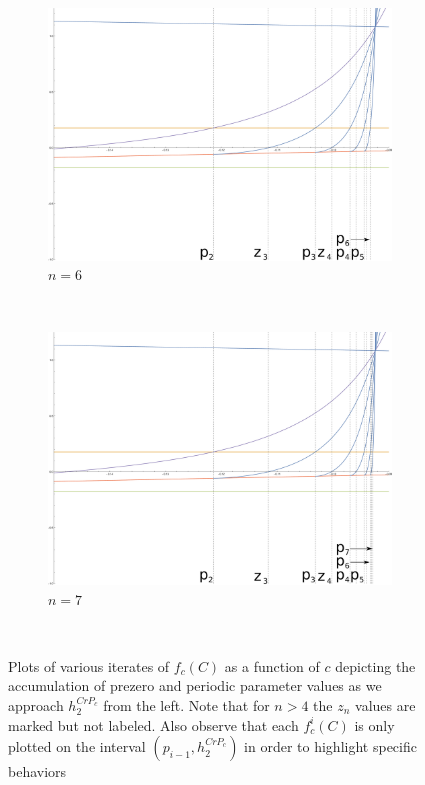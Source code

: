 \begin{figure}[ht]
\begin{subfigure}[b]{0.5\textwidth}
				\includegraphics[width=\textwidth]{./img/cplot5H}
				\caption{$n=6$}
				\label{fig:cplot5H}
		\end{subfigure}%
		~ %
		\begin{subfigure}[b]{0.5\textwidth}
				\includegraphics[width=\textwidth]{./img/cplot6H}
				\caption{$n=7$}
				\label{fig:cplot6H}
		\end{subfigure}
		~ %
		\caption{Plots of various iterates of $f_c (C)$ as a function of $c$ depicting the accumulation of prezero and periodic parameter values as we approach $h_2^{CrP_c}$ from the left. Note that for $n > 4$ the $z_n$ values are marked but not labeled. Also observe that each $f^i_c (C)$ is only plotted on the interval $ (p_{i-1}, h_2^{CrP_c})$ in order to highlight specific behaviors}\label{fig:iterh1}
\end{figure}

